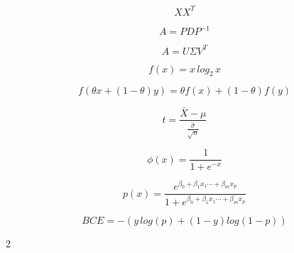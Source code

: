 \documentclass[11pt,landscape]{article}
\begin{document}
\begin{multicols}{2}
\begin{equation}
	XX^T
\end{equation}

\begin{equation}
	A = P D P^{-1}
\end{equation}

\begin{equation}
	A = U\Sigma V^T
\end{equation}

\begin{equation}
	f(x) = x\,log_2\,x
\end{equation}

\begin{equation}
	f(\theta x + (1-\theta)y) = \theta f(x) + (1-\theta)f(y)
\end{equation}

\begin{equation}
	t = \frac{\bar{X} - \mu}{\frac{\hat{\sigma}}{\sqrt{n}}}
\end{equation}



%

\begin{equation}
	\phi(x) = \frac{1}{1+e^{-x}}
\end{equation}

\begin{equation}
	p(x) = \frac{e^{\beta_0 + \beta_1 x_1 \cdots + \beta_m x_p}}{1+e^{\beta_0 + \beta_1 x_1 \cdots + \beta_m x_p}}
\end{equation}

\begin{equation}
BCE = -(y\,log(p)+(1-y)log(1-p))
\end{equation}

\end{multicols}{2}
\end{document}
